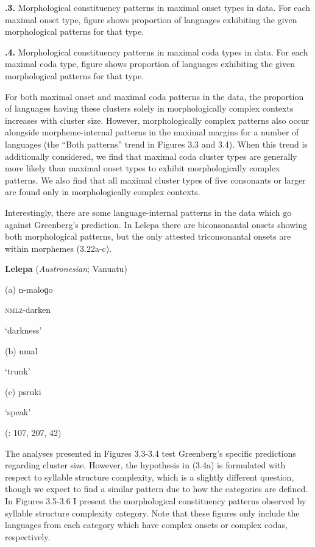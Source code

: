 \textbf{.3.} Morphological constituency patterns in maximal onset types in data. For each maximal onset type, figure shows proportion of languages exhibiting the given morphological patterns for that type.

\textbf{.4.} Morphological constituency patterns in maximal coda types in data. For each maximal coda type, figure shows proportion of languages exhibiting the given morphological patterns for that type.

  For both maximal onset and maximal coda patterns in the data, the proportion of languages having these clusters solely in morphologically complex contexts increases with cluster size. However, morphologically complex patterns also occur alongside morpheme-internal patterns in the maximal margins for a number of languages (the “Both patterns” trend in Figures 3.3 and 3.4). When this trend is additionally considered, we find that maximal coda cluster types are generally more likely than maximal onset types to exhibit morphologically complex patterns. We also find that all maximal cluster types of five consonants or larger are found only in morphologically complex contexts.

  Interestingly, there are some language-internal patterns in the data which go against Greenberg’s prediction. In Lelepa there are biconsonantal onsets showing both morphological patterns, but the only attested triconsonantal onsets are within morphemes (3.22a-c).

\ea\label{ex:(3.22)}
   \textbf{Lelepa} (\textit{Austronesian}; Vanuatu)

(a)  n-maloɡo

\textsc{nmlz}-darken

‘darkness’

(b)  nmal

‘trunk’

(c)  psruki

‘speak’

(\citealt{Lacrampe2014}: 107, 207, 42)

\z

  The analyses presented in Figures 3.3-3.4 test Greenberg’s specific predictions regarding cluster size. However, the hypothesis in (3.4a) is formulated with respect to syllable structure complexity, which is a slightly different question, though we expect to find a similar pattern due to how the categories are defined. In Figures 3.5-3.6 I present the morphological constituency patterns observed by syllable structure complexity category. Note that these figures only include the languages from each category which have complex onsets or complex codas, respectively.

